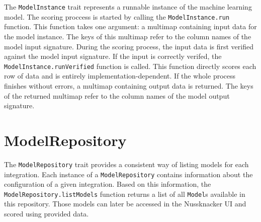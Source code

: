 The \texttt{ModelInstance} trait represents a runnable instance of the machine learning model.
The scoring proccess is started by calling the \texttt{ModelInstance.run} function.
This function takes one argument: a multimap containing input data for the model instance.
The keys of this multimap refer to the column names of the model input signature.
During the scoring process, the input data is first verified against the model input signature.
If the input is correctly verifed, the \texttt{ModelInstance.runVerified} function is called.
This function directly scores each row of data and is entirely implementation-dependent.
If the whole process finishes without errors, a multimap containing output data is returned.
The keys of the returned multimap refer to the column names of the model output signature.

\section {ModelRepository}

The  \texttt{ModelRepository} trait provides a consistent way of listing models for each integration.
Each instance of a  \texttt{ModelRepository} contains information about the configuration of a given integration.
Based on this information, the \texttt{ModelRepository.listModels} function returns a list of all \texttt{Model}s available in this repository.
Those models can later be accessed in the Nussknacker UI and scored using provided data.
